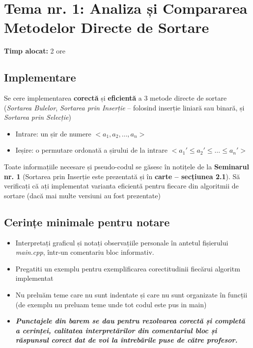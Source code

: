 \documentclass[../ro-fa-lab.tex]{subfiles}
\begin{document}
\section{\texorpdfstring{\textbf{Tema nr. 1: Analiza și Compararea Metodelor Directe de Sortare}}{Tema nr. 1: Analiza și Compararea Metodelor Directe de Sortare}}\label{assign1}

\textbf{Timp alocat:} 2 ore

\subsection{Implementare}\label{implementare}

Se cere implementarea \textbf{corectă} și \textbf{eficientă} a 3 metode
directe de sortare (\emph{Sortarea Bulelor}, \emph{Sortarea prin
Inserție} -- folosind inserție liniară sau binară, și \emph{Sortarea
prin Selecție})

\begin{itemize}
\item
  Intrare: un șir de numere \(< a_{1},a_{2},\ldots,a_{n} >\)
\item
  Ieșire: o permutare ordonată a șirului de la intrare
  \({< a}_{1}' \leq a_{2}' \leq \ldots \leq a_{n}' >\)
\end{itemize}

Toate informațiile necesare și pseudo-codul se găsesc în notițele de la
\textbf{Seminarul nr. 1} (Sortarea prin Inserție este prezentată și în
\textbf{carte\citep{cormen} -- secțiunea 2.1}). Să verificați că
ați implementat varianta eficientă pentru fiecare din algoritmii de
sortare (dacă mai multe versiuni au fost prezentate)

\subsection{Cerințe minimale pentru
notare}\label{cerinux21be-minimale-pentru-notare}

\begin{itemize}
\item
  Interpretați graficul și notați observațiile personale în antetul
  fișierului \emph{main.cpp}, într-un comentariu bloc informativ.
\end{itemize}

\begin{itemize}
\item
  Pregatiti un exemplu pentru exemplificarea corectitudinii fiecărui
  algoritm implementat
\item
  Nu preluăm teme care nu sunt indentate și care nu sunt organizate în
  funcții (de exemplu nu preluam teme unde tot codul este pus in main)
\item
  \emph{\textbf{Punctajele din barem se dau pentru rezolvarea corectă și
  completă a cerinței, calitatea interpretărilor din comentariul bloc și
  răspunsul corect dat de voi la întrebările puse de către profesor.}}
\end{itemize}
\end{document}
